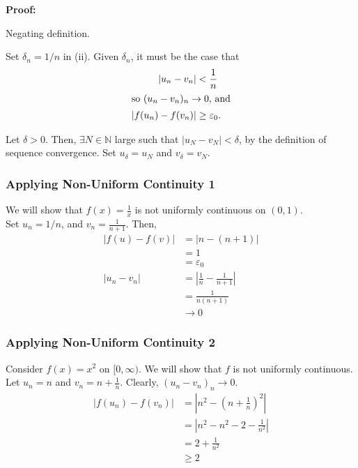 \documentclass[10pt]{extarticle}
\newcommand{\N}{\mathbb{N}}
\begin{document}
    \textbf{Proof:}
    \begin{description}[font=\normalfont]
      \item[(i) $\Leftrightarrow$ (ii):] Negating definition.
      \item[(ii) $\Rightarrow$ (iii):] Set $\delta_n = 1/n$ in (ii). Given $\delta_n$, it must be the case that
        \begin{align*}
          |u_n - v_n| &< \frac{1}{n}\\
          \shortintertext{so $(u_n - v_n)_n \rightarrow 0$, and}
          |f(u_n) - f(v_n)| &\geq \varepsilon_0.
        \end{align*}
      \item[(iii) $\Rightarrow$ (ii):] Let $\delta > 0$. Then, $\exists N\in \N$ large such that $|u_N - v_N| < \delta$, by the definition of sequence convergence. Set $u_{\delta} = u_N$ and $v_{\delta} = v_N$.
    \end{description}
    \subsubsection{Applying Non-Uniform Continuity 1}%
    We will show that $f(x) = \frac{1}{x}$ is not uniformly continuous on $(0,1)$.\\

    Set $u_n = 1/n$, and $v_n = \frac{1}{n+1}$. Then,
    \begin{align*}
      |f(u) - f(v)| &= |n-(n+1)|\\
                    &= 1\\
                    &=\varepsilon_0\\
      |u_n - v_n| &= \left|\frac{1}{n} - \frac{1}{n+1}\right|\\
                  &= \frac{1}{n(n+1)}\\
                  &\rightarrow 0
    \end{align*}
    \subsubsection{Applying Non-Uniform Continuity 2}%
    Consider $f(x) = x^2$ on $[0,\infty)$. We will show that $f$ is not uniformly continuous.\\

    Let $u_n = n$ and $v_n = n + \frac{1}{n}$. Clearly, $(u_n - v_n)_n \rightarrow 0$.
    \begin{align*}
      |f(u_n) - f(v_n)| &= \left|n^2 - \left(n+\frac{1}{n}\right)^2\right|\\
                        &= \left|n^2 - n^2 - 2 - \frac{1}{n^2}\right|\\
                        &= 2 + \frac{1}{n^2}\\
                        &\geq 2
    \end{align*}
\end{document}
